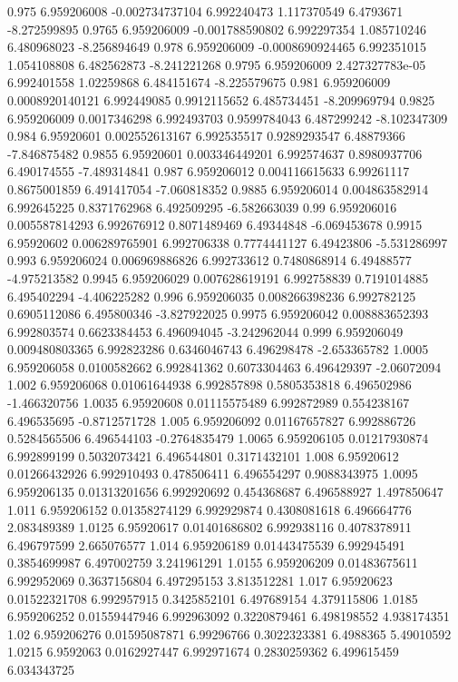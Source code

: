 {0.975 6.959206008 -0.002734737104 6.992240473 1.117370549 6.4793671 -8.272599895
0.9765 6.959206009 -0.001788590802 6.992297354 1.085710246 6.480968023 -8.256894649
0.978 6.959206009 -0.0008690924465 6.992351015 1.054108808 6.482562873 -8.241221268
0.9795 6.959206009 2.427327783e-05 6.992401558 1.02259868 6.484151674 -8.225579675
0.981 6.959206009 0.0008920140121 6.992449085 0.9912115652 6.485734451 -8.209969794
0.9825 6.959206009 0.0017346298 6.992493703 0.9599784043 6.487299242 -8.102347309
0.984 6.95920601 0.002552613167 6.992535517 0.9289293547 6.48879366 -7.846875482
0.9855 6.95920601 0.003346449201 6.992574637 0.8980937706 6.490174555 -7.489314841
0.987 6.959206012 0.004116615633 6.99261117 0.8675001859 6.491417054 -7.060818352
0.9885 6.959206014 0.004863582914 6.992645225 0.8371762968 6.492509295 -6.582663039
0.99 6.959206016 0.005587814293 6.992676912 0.8071489469 6.49344848 -6.069453678
0.9915 6.95920602 0.006289765901 6.992706338 0.7774441127 6.49423806 -5.531286997
0.993 6.959206024 0.006969886826 6.992733612 0.7480868914 6.49488577 -4.975213582
0.9945 6.959206029 0.007628619191 6.992758839 0.7191014885 6.495402294 -4.406225282
0.996 6.959206035 0.008266398236 6.992782125 0.6905112086 6.495800346 -3.827922025
0.9975 6.959206042 0.008883652393 6.992803574 0.6623384453 6.496094045 -3.242962044
0.999 6.959206049 0.009480803365 6.992823286 0.6346046743 6.496298478 -2.653365782
1.0005 6.959206058 0.0100582662 6.992841362 0.6073304463 6.496429397 -2.06072094
1.002 6.959206068 0.01061644938 6.992857898 0.5805353818 6.496502986 -1.466320756
1.0035 6.95920608 0.01115575489 6.992872989 0.554238167 6.496535695 -0.8712571728
1.005 6.959206092 0.01167657827 6.992886726 0.5284565506 6.496544103 -0.2764835479
1.0065 6.959206105 0.01217930874 6.992899199 0.5032073421 6.496544801 0.3171432101
1.008 6.95920612 0.01266432926 6.992910493 0.478506411 6.496554297 0.9088343975
1.0095 6.959206135 0.01313201656 6.992920692 0.454368687 6.496588927 1.497850647
1.011 6.959206152 0.01358274129 6.992929874 0.4308081618 6.496664776 2.083489389
1.0125 6.95920617 0.01401686802 6.992938116 0.4078378911 6.496797599 2.665076577
1.014 6.959206189 0.01443475539 6.992945491 0.3854699987 6.497002759 3.241961291
1.0155 6.959206209 0.01483675611 6.992952069 0.3637156804 6.497295153 3.813512281
1.017 6.95920623 0.01522321708 6.992957915 0.3425852101 6.497689154 4.379115806
1.0185 6.959206252 0.01559447946 6.992963092 0.3220879461 6.498198552 4.938174351
1.02 6.959206276 0.01595087871 6.99296766 0.3022323381 6.4988365 5.49010592
1.0215 6.9592063 0.0162927447 6.992971674 0.2830259362 6.499615459 6.034343725
}
